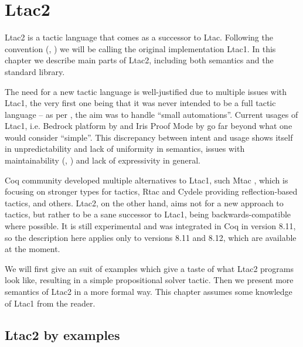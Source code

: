 \chapter{Ltac2}

Ltac2 is a tactic language that comes as a successor to Ltac.
Following the convention (\cite[Section 3.3.2]{thecoqdevelopmentteamCoqProofAssistant2020}, \cite{pedrotLtac2TacticalWarfare2019}) we will be calling the original implementation Ltac1.
In this chapter we describe main parts of Ltac2, including both semantics and the standard library.

The need for a new tactic language is well-justified due to multiple issues with Ltac1, the very first one being that it was never intended to be a full tactic language -- as per \citet{pedrotCoqHoTTminuteTickingClockwork2016}, the aim was to handle ``small automations''.
Current usages of Ltac1, i.e. Bedrock platform by \citet{chlipalaMostlyautomatedVerificationLowlevel2011} and Iris Proof Mode by \citet{krebbersInteractiveProofsHigherorder2017, krebbersMoSeLGeneralExtensible2018} go far beyond what one would consider ``simple''.
This discrepancy between intent and usage shows itself in unpredictability and lack of uniformity in semantics, issues with maintainability (\cite[Section 3.3.2]{thecoqdevelopmentteamCoqProofAssistant2020}, \cite{pedrotLtac2TacticalWarfare2019}) and lack of expressivity in general.

Coq community developed multiple alternatives to Ltac1, such Mtac \cite*{zilianiMtacMonadTyped2013, kaiserMtac2TypedTactics2018a}, which is focusing on stronger types for tactics,
Rtac \cite{malechaExtensibleEfficientAutomation2016} and Cydele \cite{claretLightweightProofReflection2013} providing reflection-based tactics, and others.
Ltac2, on the other hand, aims not for a new approach to tactics, but rather to be a sane successor to Ltac1, being backwards-compatible where possible.
It is still experimental and was integrated in Coq in version 8.11, so the description here applies only to versions 8.11 and 8.12, which are available at the moment.

We will first give an suit of examples which give a taste of what Ltac2 programs look like, resulting in a simple propositional solver tactic.
Then we present more semantics of Ltac2 in a more formal way.
This chapter assumes some knowledge of Ltac1 from the reader.

\section{Ltac2 by examples}
\label{sec:ltac2-by-examples}

